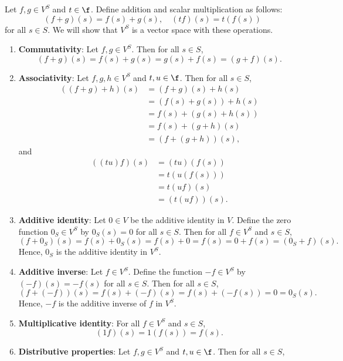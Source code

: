 \begin{sol}
    Let $f, g \in V^S$ and $t \in \f$. Define addition and scalar multiplication as follows:
    \[(f + g)(s) = f(s) + g(s), \quad (tf)(s) = t(f(s))\]
    for all $s \in S$. We will show that $V^S$ is a vector space with these operations.
    \begin{enumerate}
        \item \textbf{Commutativity}: Let $f, g \in V^S$. Then for all $s \in S$,
        \[(f + g)(s) = f(s) + g(s) = g(s) + f(s) = (g + f)(s).\]
        \item \textbf{Associativity}: Let $f, g, h \in V^S$ and $t, u \in \f$. Then for all $s \in S$,
        \begin{align*}
            ((f + g) + h)(s) &= (f + g)(s) + h(s) \\
            &= (f(s) + g(s)) + h(s) \\
            &= f(s) + (g(s) + h(s)) \\
            &= f(s) + (g + h)(s) \\
            &= (f + (g + h))(s),
        \end{align*}
        and
        \begin{align*}
            ((tu)f)(s) & = (tu)(f(s)) \\
            & = t(u(f(s))) \\
            & = t(uf)(s) \\
            & = (t(uf))(s).
        \end{align*}
        \item \textbf{Additive identity}: Let $0 \in V$ be the additive identity in $V$. Define the zero function $0_S \in V^S$ by $0_S(s) = 0$ for all $s \in S$. Then for all $f \in V^S$ and $s \in S$,
        \[(f + 0_S)(s) = f(s) + 0_S(s) = f(s) + 0 = f(s) = 0 + f(s) = (0_S + f)(s).\]
        Hence, $0_S$ is the additive identity in $V^S$.
        \item \textbf{Additive inverse}: Let $f \in V^S$. Define the function $-f \in V^S$ by $(-f)(s) = -f(s)$ for all $s \in S$. Then for all $s \in S$,
        \[(f + (-f))(s) = f(s) + (-f)(s) = f(s) + (-f(s)) = 0 = 0_S(s).\]
        Hence, $-f$ is the additive inverse of $f$ in $V^S$.
        \item \textbf{Multiplicative identity}: For all $f \in V^S$ and $s \in S$,
        \[(1f)(s) = 1(f(s)) = f(s).\]
        \item \textbf{Distributive properties}: Let $f, g \in V^S$ and $t, u \in \f$. Then for all $s \in S$,
        \begin{align*}

\end{align*}
\end{enumerate}
\end{sol}
